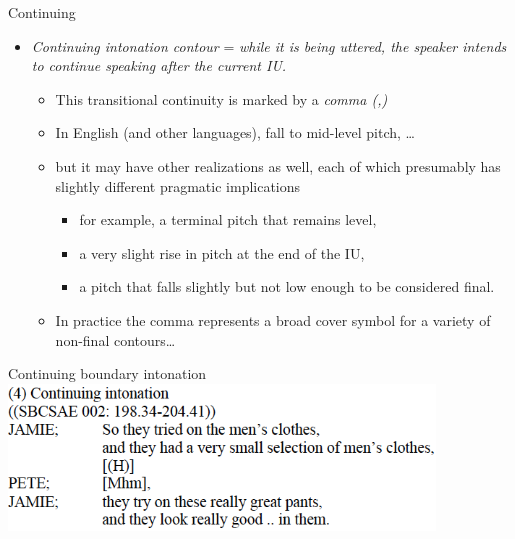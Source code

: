 \documentclass[compress,12pt]{beamer}%
\begin{document}
  \begin{frame}{Continuing}
    \begin{itemize}
      \item[] \emph{Continuing intonation contour} = \textit{while it is being uttered, the speaker intends to continue speaking after the current IU.}
      \begin{itemize}
        \item This transitional continuity is marked by a \emph{comma (,)}
        \item In English (and other languages), fall to mid-level pitch, \ldots
        \item but it may have other realizations as well, each of which presumably has slightly different pragmatic implications
        \begin{itemize} 
          \item  for example, a terminal pitch that remains level, 
          \item a very slight rise in pitch at the end of the IU, 
          \item a pitch that falls slightly but not low enough to be considered final.
      \end{itemize}
      \item In practice the comma represents a broad cover symbol for a variety of non-final contours\ldots
    \end{itemize}
    \end{itemize}  
  \end{frame}

  \begin{frame}{Continuing boundary intonation}
    \includegraphics[width=0.85\textwidth]{images/Cont_Ex4.png}\\
  \end{frame}
\end{document}
